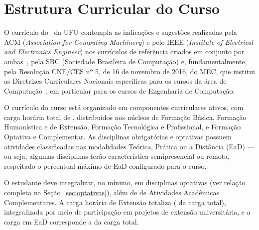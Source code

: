 \chapter{Estrutura Curricular do Curso}

O currículo do \ppccurso\ da UFU contempla as indicações e sugestões realizadas pela ACM (\textit{Association for Computing Machinery}) e pelo IEEE (\textit{Institute of Electrical and Electronics Engineer}) nos currículos de referência criados em conjunto por ambas~\cite{acm_cc2020}, pela SBC (Sociedade Brasileira de Computação) e, fundamentalmente, pela Resolução CNE/CES nº 5, de 16 de novembro de 2016, do MEC, que institui as Diretrizes Curriculares Nacionais específicas para os cursos da área de Computação~\cite{cne_ces_5_2016}, em particular para os cursos de Engenharia de Computação.

O currículo do curso está organizado em  componentes curriculares ativos, com carga horária total de \textbf{}, distribuídos nos núcleos de Formação Básica, Formação Humanística e de Extensão, Formação Tecnológica e Profissional, e Formação Optativa e Complementar. As disciplinas obrigatórias e optativas possuem atividades classificadas nas modalidades Teórica, Prática ou a Distância (EaD) — ou seja, algumas disciplinas terão característica semipresencial ou remota, respeitado o percentual máximo de EaD configurado para o curso.

O estudante deve integralizar, no mínimo, \textbf{} em disciplinas optativas (ver relação completa na Seção~\ref{sec:optativas}), além de \textbf{} de Atividades Acadêmicas Complementares. A carga horária de Extensão totaliza \textbf{} ( da carga total), integralizada por meio de participação em projetos de extensão universitária, e a carga em EaD corresponde a  da carga total.

